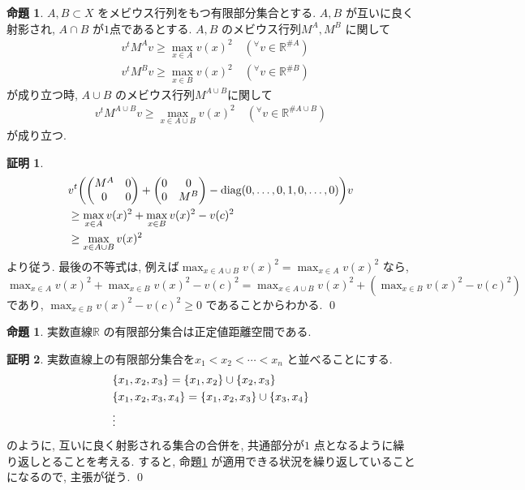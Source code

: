 \documentclass[10pt, fleqn, label-section=none]{bxjsarticle}
\theoremstyle{definition}
\newtheorem{prop}[dfn]{命題}
\newtheorem*{pf*}{証明}
\newcommand{\any}{{}^{\forall}}
\newcommand{\paren}[1]{\mleft( #1\mright )}
\newcommand{\cbra}[1]{\mleft\{#1\mright\}}
\newcommand{\diag}{\textrm{diag}}
\renewcommand{\;}{\, ; \,}
\newcommand{\gyouretsu}[1]{\begin{pmatrix} #1 \end{pmatrix} }
\begin{document}
\begin{prop}\label{2149} $A, B \subset X$ をメビウス行列をもつ有限部分集合とする. $A, B$ が互いに良く射影され, $A \cap B$ が$1$点であるとする. $A, B$ のメビウス行列$M^A, M^B$ に関して
\begin{align*} & v^t M^A v \geq \max_{x \in A }{v(x)^2 } \quad (\any v \in \mathbb R^{\# A}) \\ & v^t M^B v \geq \max_{x \in B }{v(x)^2 } \quad (\any v \in \mathbb R^{\# B}) \end{align*}
が成り立つ時, $A \cup B$ のメビウス行列$M^{A \cup B}$に関して
\begin{align*}  v^t M^{A \cup B} v \geq \max_{x \in A \cup B }{v(x)^2 } \quad (\any v \in \mathbb R^{\# A \cup B})  \end{align*}
が成り立つ. 
\end{prop}
\begin{pf*}
\begin{align*} & v^t \paren{ \gyouretsu{ M^A & 0 \\ 0 & 0   } + \gyouretsu{ 0 & 0 \\ 0 & M^B   } - \diag(0, \ldots ,0,  1 , 0, \ldots , 0) } v \\& \geq \max_{x \in A}  v(x) ^2  + \max_{x \in B} v(x) ^2  - v(c)^2  \\& \geq \max_{x \in A \cup B}  v(x) ^2  \end{align*}
より従う. 最後の不等式は, 例えば$\max_{x \in A \cup B}  v(x) ^2  = \max_{x \in A}  v(x) ^2 $ なら, $\max_{x \in A}  v(x) ^2  + \max_{x \in B} v(x) ^2  - v(c)^2  =\max_{x \in A \cup B}  v(x) ^2 +  (\max_{x \in B} v(x) ^2  - v(c)^2) $ であり, $\max_{x \in B} v(x) ^2  - v(c)^2 \geq 0 $ であることからわかる. 
\qed
\end{pf*}



\begin{prop}実数直線$\mathbb R$ の有限部分集合は正定値距離空間である. 
\end{prop}
\begin{pf*}
実数直線上の有限部分集合を$x_1 < x_2 < \cdots < x_n$ と並べることにする. 
\begin{align*} &\cbra{x_1, x_2, x_3} =  \cbra{x_1, x_2} \cup \cbra{x_2, x_3} \\
&\cbra{x_1, x_2, x_3, x_4} =  \cbra{x_1, x_2, x_3} \cup \cbra{x_3, x_4} \\ 
& \vdots 
\end{align*}
のように, 互いに良く射影される集合の合併を, 共通部分が$1$ 点となるように繰り返しとることを考える. すると, 命題\ref {2149} が適用できる状況を繰り返していることになるので, 主張が従う. 
\qed
\end{pf*}
\end{document}
